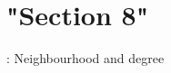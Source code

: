 \chapter{"{}\+Section 8"{}}
\hypertarget{SECTION_8}{}\label{SECTION_8}
\+: Neighbourhood and degree 